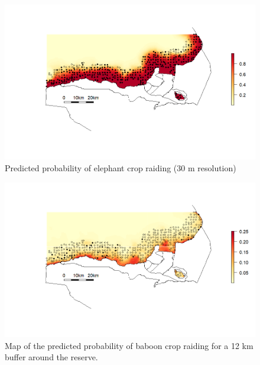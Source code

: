 \documentclass[12pt,]{article}
\begin{document}
\begin{figure}[H]
    \centering
    \includegraphics[width=\textwidth]{Figures/elephant_predictionmap.png} %
    \caption{Predicted probability of elephant crop raiding (30 m resolution)}
    \label{fig:elepred}
\end{figure}

\begin{figure}[H]
    \centering
    \includegraphics[width=\textwidth]{Figures/baboon_predictionmap.png} %
    \caption{Map of the predicted probability of baboon crop raiding for a 12 km buffer around the reserve.}
    \label{fig:baboonpred}
\end{figure}
\end{document}
